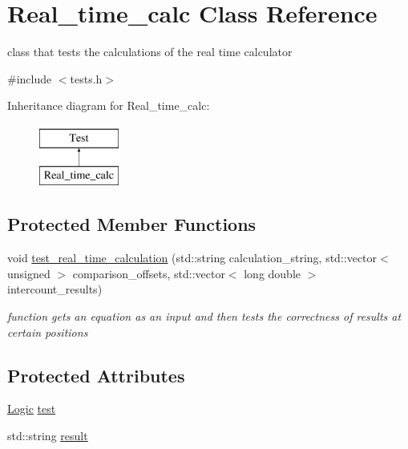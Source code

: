 \hypertarget{class_real__time__calc}{}\section{Real\+\_\+time\+\_\+calc Class Reference}
\label{class_real__time__calc}


class that tests the calculations of the real time calculator  




{\ttfamily \#include $<$tests.\+h$>$}

Inheritance diagram for Real\+\_\+time\+\_\+calc\+:\begin{figure}[H]
\begin{center}
\leavevmode
\includegraphics[height=2.000000cm]{class_real__time__calc}
\end{center}
\end{figure}
\subsection*{Protected Member Functions}
\begin{DoxyCompactItemize}
\item 
void \mbox{\hyperlink{class_real__time__calc_a84f90f6bd1e5e47ad347097c6f2a0067}{test\+\_\+real\+\_\+time\+\_\+calculation}} (std\+::string calculation\+\_\+string, std\+::vector$<$ unsigned $>$ comparison\+\_\+offsets, std\+::vector$<$ long double $>$ intercount\+\_\+results)
\begin{DoxyCompactList}\small\item\em function gets an equation as an input and then tests the correctness of results at certain positions \end{DoxyCompactList}\end{DoxyCompactItemize}
\subsection*{Protected Attributes}
\begin{DoxyCompactItemize}
\item 
\mbox{\hyperlink{class_logic}{Logic}} \mbox{\hyperlink{class_real__time__calc_a28c9b3ee44288355ebb2fe4bd20646a6}{test}}
\item 
std\+::string \mbox{\hyperlink{class_real__time__calc_a8b93db8f774dd3e3ffef2d9e6bc56079}{result}}
\end{DoxyCompactItemize}


